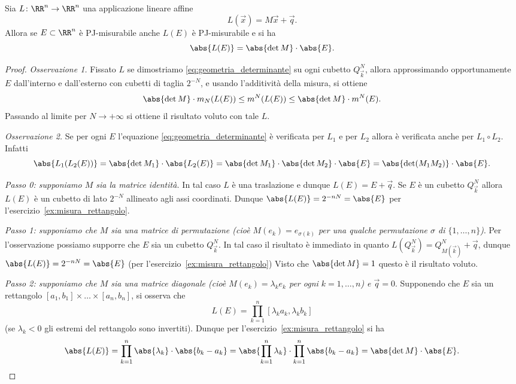 \begin{theorem}
  \label{th:geometria_determinante}
Sia $L\colon \RR^n\to \RR^n$ una applicazione lineare affine
\[
  L(\vec x) = M\vec x + \vec q.
\]
Allora se $E\subset \RR^n$ è PJ-misurabile anche $L(E)$ è PJ-misurabile 
e si ha 
\begin{equation}\label{eq:geometria_determinante}
  \abs{L(E)} = \abs{\det M} \cdot \abs{E}.
\end{equation}
\end{theorem}
%
\begin{proof}
\emph{Osservazione 1.}
Fissato $L$ se dimostriamo 
\eqref{eq:geometria_determinante}
su ogni cubetto $Q^N_{\vec k}$, 
allora approssimando opportunamente 
$E$ dall'interno e dall'esterno con cubetti di taglia $2^{-N}$, 
e usando l'additività della misura,
si ottiene
\[
  \abs{\det M} \cdot m_N(L(E)) \le m^N(L(E)) \le \abs{\det M}\cdot m^N(E).
\]
Passando al limite per $N\to +\infty$ si ottiene il risultato 
voluto con tale $L$.

\emph{Osservazione 2.}
Se per ogni $E$ l'equazione 
\eqref{eq:geometria_determinante} è verificata per $L_1$ e per $L_2$ 
allora è verificata anche per 
$L_1\circ L_2$. 
Infatti
\[
  \abs{L_1(L_2(E))} = \abs{\det M_1} \cdot \abs{L_2(E)} = \abs{\det M_1} \cdot \abs{\det M_2} \cdot \abs{E}
  = \abs{\det(M_1M_2)}\cdot\abs{E}.
\]

\emph{Passo 0: supponiamo $M$ sia la matrice identità.}
In tal caso $L$ è una traslazione e dunque $L(E) = E + \vec q$.
Se $E$ è un cubetto $Q^N_{\vec k}$ allora $L(E)$ 
è un cubetto di lato $2^{-N}$ allineato agli assi coordinati.
Dunque $\abs{L(E)} = 2^{-nN} = \abs{E}$ per l'esercizio~\ref{ex:misura_rettangolo}.

\emph{Passo 1: supponiamo che $M$ sia una matrice di permutazione
(cioè $M(e_k) = e_{\sigma(k)}$ per una qualche permutazione $\sigma$ di
$\{1,\ldots,n\}$)}.
Per l'osservazione possiamo supporre che $E$ sia un cubetto $Q^N_{\vec k}$.
In tal caso il risultato è immediato in quanto $L(Q^N_{\vec k}) = Q^N_{M(\vec k)}+\vec q$,
dunque $\abs{L(E)} = 2^{-nN} = \abs{E}$ (per l'esercizio~\ref{ex:misura_rettangolo})
Visto che $\abs{\det M} = 1$ questo è il risultato voluto. 

\emph{Passo 2: supponiamo che $M$ sia una matrice diagonale
(cioè $M(e_k) = \lambda_k e_k$ per ogni $k=1,\ldots,n$) e $\vec q=0$}.
Supponendo che $E$ sia un rettangolo $[a_1,b_1]\times \dots \times [a_n,b_n]$,
si osserva che 
\[
  L(E) = \prod_{k=1}^n [\lambda_k a_k, \lambda_k b_k]
\]
(se $\lambda_k < 0$ gli estremi del rettangolo sono invertiti).
Dunque per l'esercizio~\ref{ex:misura_rettangolo} si ha
\[
  \abs{L(E)} = \prod_{k=1}^n \abs{\lambda_k}\cdot \abs{b_k-a_k}
  = \abs{\prod_{k=1}^n \lambda_k } \cdot \prod_{k=1}^n \abs{b_k - a_k} 
  = \abs{\det M} \cdot \abs{E}.
\]


\end{proof}
